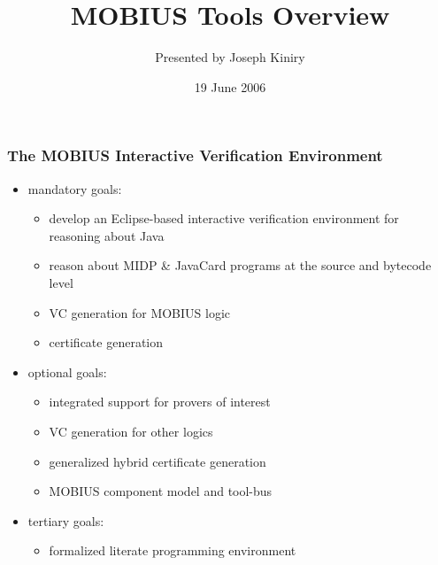 \documentclass{beamer}
\title{MOBIUS Tools Overview}
\author[J. Kiniry (UCD)]{Presented by Joseph Kiniry}
\institute{INRIA, RUN, UCD, WU\\[1ex]
  \texttt{[image: ../../../TexInputs/mobius\_transparent]}}
\date{19 June 2006}
\begin{document}
\begin{frame}
  \titlepage
\end{frame}

\begin{frame}\frametitle{The MOBIUS Interactive Verification Environment}
  \begin{itemize}
  \item mandatory goals:
    \begin{itemize}
    \item develop an Eclipse-based interactive verification environment
      for reasoning about Java
    \item reason about MIDP \& JavaCard programs at the source and
      bytecode level
    \item VC generation for MOBIUS logic
    \item certificate generation
    \end{itemize}
  \item optional goals:
    \begin{itemize}
    \item integrated support for provers of interest
    \item VC generation for other logics
    \item generalized hybrid certificate generation
    \item MOBIUS component model and tool-bus
    \end{itemize}
  \item tertiary goals:
    \begin{itemize}
    \item formalized literate programming environment
    \end{itemize}
  \end{itemize}
\end{frame}
\end{document}
